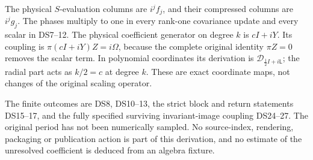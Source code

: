 \documentclass[11pt]{article}
\newcommand{\calD}{\mathscr D}
\begin{document}
The physical \(S\)-evaluation columns are \(i^jf_j\), and their
compressed columns are \(i^jg_j\). The phases multiply to one in every
rank-one covariance update and every scalar in DS7--12. The physical
coefficient generator on degree \(k\) is
\(cI+iY\). Its coupling is
\(\pi(cI+iY)Z=i\Omega\), because the complete original identity
\(\pi Z=0\) removes the scalar term. In polynomial coordinates its
derivation is \(\calD_{\frac12I+i\mathsf L}\); the radial part acts
as \(k/2=c\) at degree \(k\). These are exact coordinate maps,
not changes of the original scaling operator.

The finite outcomes are DS8, DS10--13, the strict block and return
statements DS15--17, and the fully specified surviving invariant-image
coupling DS24--27. The original period has not been numerically sampled.
No source-index, rendering, packaging or publication action is part of
this derivation, and no estimate of the unresolved coefficient is
deduced from an algebra fixture.
\end{document}
